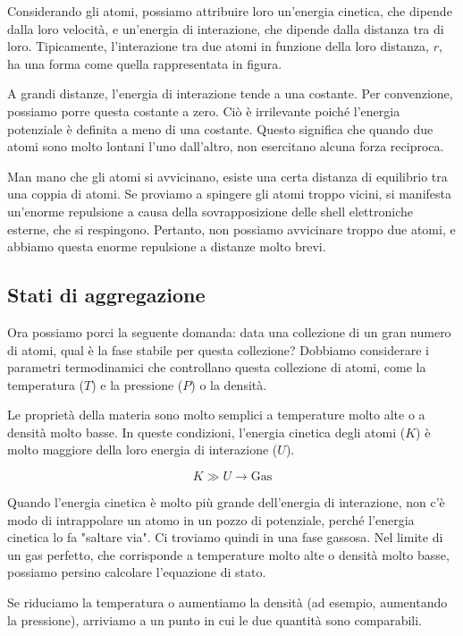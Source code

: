Considerando gli atomi, possiamo attribuire loro un'energia cinetica, che dipende dalla loro velocità, e un'energia di interazione, che dipende dalla distanza tra di loro. Tipicamente, l'interazione tra due atomi in funzione della loro distanza, $r$, ha una forma come quella rappresentata in figura.

A grandi distanze, l'energia di interazione tende a una costante. Per convenzione, possiamo porre questa costante a zero. Ciò è irrilevante poiché l'energia potenziale è definita a meno di una costante. Questo significa che quando due atomi sono molto lontani l'uno dall'altro, non esercitano alcuna forza reciproca.

Man mano che gli atomi si avvicinano, esiste una certa distanza di equilibrio tra una coppia di atomi. Se proviamo a spingere gli atomi troppo vicini, si manifesta un'enorme repulsione a causa della sovrapposizione delle shell elettroniche esterne, che si respingono. Pertanto, non possiamo avvicinare troppo due atomi, e abbiamo questa enorme repulsione a distanze molto brevi.

\subsection{Stati di aggregazione}

Ora possiamo porci la seguente domanda: data una collezione di un gran numero di atomi, qual è la fase stabile per questa collezione? Dobbiamo considerare i parametri termodinamici che controllano questa collezione di atomi, come la temperatura ($T$) e la pressione ($P$) o la densità.

Le proprietà della materia sono molto semplici a temperature molto alte o a densità molto basse. In queste condizioni, l'energia cinetica degli atomi ($K$) è molto maggiore della loro energia di interazione ($U$).

\begin{equation}
 K \gg U \rightarrow \text{Gas}
\end{equation}

Quando l'energia cinetica è molto più grande dell'energia di interazione, non c'è modo di intrappolare un atomo in un pozzo di potenziale, perché l'energia cinetica lo fa "saltare via". Ci troviamo quindi in una fase gassosa. Nel limite di un gas perfetto, che corrisponde a temperature molto alte o densità molto basse, possiamo persino calcolare l'equazione di stato.

Se riduciamo la temperatura o aumentiamo la densità (ad esempio, aumentando la pressione), arriviamo a un punto in cui le due quantità sono comparabili.

